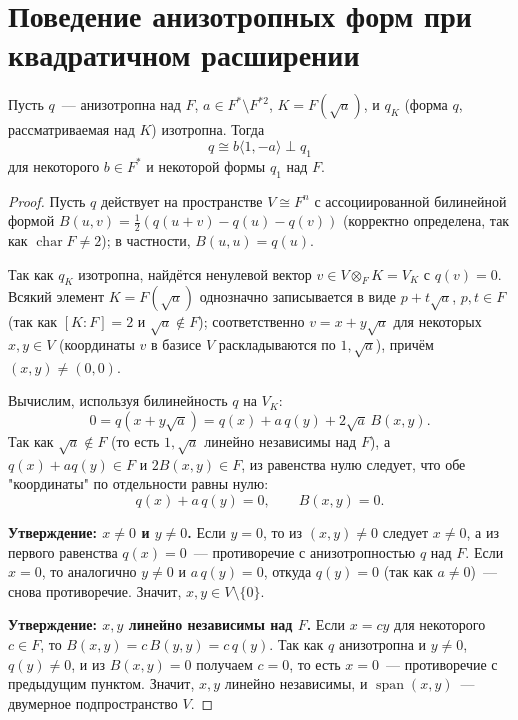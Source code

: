 \documentclass[12pt]{article}
\begin{document}
	\section{Поведение анизотропных форм при квадратичном расширении}
	
	\begin{theorem}
		Пусть $q$~--- анизотропна над $F$, $a \in F^* \setminus F^{*2}$, $K = F(\sqrt{a})$, и $q_K$ (форма $q$, рассматриваемая над $K$) изотропна. Тогда
		\[
		q \cong b \langle 1, -a \rangle \perp q_1
		\]
		для некоторого $b \in F^*$ и некоторой формы $q_1$ над $F$.
	\end{theorem}
	
	\begin{proof}
		Пусть $q$ действует на пространстве $V \cong F^n$ с ассоциированной билинейной формой $B(u, v) = \tfrac{1}{2}\left( q(u+v) - q(u) - q(v) \right)$ (корректно определена, так как $\operatorname{char} F \neq 2$); в частности, $B(u, u) = q(u)$.
		
		Так как $q_K$ изотропна, найдётся ненулевой вектор $v \in V \otimes_F K = V_K$ с $q(v) = 0$. Всякий элемент $K = F(\sqrt a)$ однозначно записывается в виде $p + t\sqrt a$, $p, t \in F$ (так как $[K:F]=2$ и $\sqrt a \notin F$); соответственно $v = x + y\sqrt{a}$ для некоторых $x, y \in V$ (координаты $v$ в базисе $V$ раскладываются по $1, \sqrt a$), причём $(x, y) \neq (0,0)$.
		
		Вычислим, используя билинейность $q$ на $V_K$:
		\[
		0 = q(x + y\sqrt a) = q(x) + a\, q(y) + 2\sqrt a \, B(x, y).
		\]
		Так как $\sqrt a \notin F$ (то есть $1, \sqrt a$ линейно независимы над $F$), а $q(x) + a q(y) \in F$ и $2B(x,y) \in F$, из равенства нулю следует, что обе "координаты" по отдельности равны нулю:
		\[
		q(x) + a\, q(y) = 0, \qquad B(x, y) = 0.
		\]
		
		\textbf{Утверждение: $x \neq 0$ и $y \neq 0$.} Если $y = 0$, то из $(x,y)\neq 0$ следует $x \neq 0$, а из первого равенства $q(x) = 0$~--- противоречие с анизотропностью $q$ над $F$. Если $x = 0$, то аналогично $y \neq 0$ и $a\, q(y) = 0$, откуда $q(y) = 0$ (так как $a \neq 0$)~--- снова противоречие. Значит, $x, y \in V \setminus \{0\}$.
		
		\textbf{Утверждение: $x, y$ линейно независимы над $F$.} Если $x = cy$ для некоторого $c \in F$, то $B(x,y) = c\, B(y,y) = c\, q(y)$. Так как $q$ анизотропна и $y \neq 0$, $q(y) \neq 0$, и из $B(x,y)=0$ получаем $c = 0$, то есть $x = 0$~--- противоречие с предыдущим пунктом. Значит, $x, y$ линейно независимы, и $\operatorname{span}(x, y)$~--- двумерное подпространство $V$.
		

\end{proof}
\end{document}

